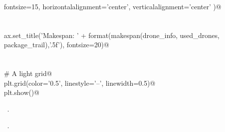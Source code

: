 \documentclass[12.0pt]{report}
\begin{document}
\begin{flushleft}
\begin{minipage}{\linewidth}
\begin{list}{}{}
\mbox{}\verb@                  fontsize=15, horizontalalignment='center', verticalalignment='center' )@\\
\mbox{}\verb@@\\
\mbox{}\verb@@\\
\mbox{}\verb@    ax.set_title('Makespan: ' + format(makespan(drone_info, used_drones, package_trail),'.5f'), fontsize=20)@\\
\mbox{}\verb@@\\
\mbox{}\verb@@\\
\mbox{}\verb@    # A light grid@\\
\mbox{}\verb@    plt.grid(color='0.5', linestyle='--', linewidth=0.5)@\\
\mbox{}\verb@    plt.show()@\\
\mbox{}\verb@@{\NWsep}
\end{list}
\vspace{-1.5ex}
\footnotesize
\begin{list}{}{\setlength{\itemsep}{-\parsep}\setlength{\itemindent}{-\leftmargin}}
\item \NWtxtMacroDefBy\ .
\item \NWtxtMacroRefIn\ .

\item{}
\end{list}
\end{minipage}\vspace{4ex}
\end{flushleft}
\end{document}
